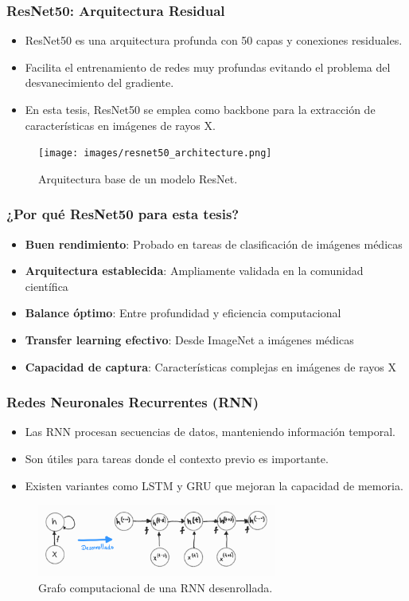 \begin{frame}
\frametitle{ResNet50: Arquitectura Residual}
\begin{itemize}
    \item ResNet50 es una arquitectura profunda con 50 capas y conexiones residuales.
    \item Facilita el entrenamiento de redes muy profundas evitando el problema del desvanecimiento del gradiente.
    \item En esta tesis, ResNet50 se emplea como backbone para la extracción de características en imágenes de rayos X.
\end{itemize}
\begin{figure}[ht!]
    \centering
    \texttt{[image: images/resnet50\_architecture.png]}
    \caption{Arquitectura base de un modelo ResNet.}
\end{figure}
\end{frame}

\begin{frame}
\frametitle{¿Por qué ResNet50 para esta tesis?}
\begin{itemize}
    \item \textbf{Buen rendimiento}: Probado en tareas de clasificación de imágenes médicas
    \item \textbf{Arquitectura establecida}: Ampliamente validada en la comunidad científica
    \item \textbf{Balance óptimo}: Entre profundidad y eficiencia computacional
    \item \textbf{Transfer learning efectivo}: Desde ImageNet a imágenes médicas
    \item \textbf{Capacidad de captura}: Características complejas en imágenes de rayos X
\end{itemize}
\end{frame}

\begin{frame}
\frametitle{Redes Neuronales Recurrentes (RNN)}
\begin{itemize}
    \item Las RNN procesan secuencias de datos, manteniendo información temporal.
    \item Son útiles para tareas donde el contexto previo es importante.
    \item Existen variantes como LSTM y GRU que mejoran la capacidad de memoria.
\end{itemize}
\begin{figure}[ht!]
    \centering
    \includegraphics[width=0.7\textwidth]{../Chapters/2. Transformer/Figures/rnn/rnn_cgraph.png}
    \caption{Grafo computacional de una RNN desenrollada.}
\end{figure}
\end{frame}

